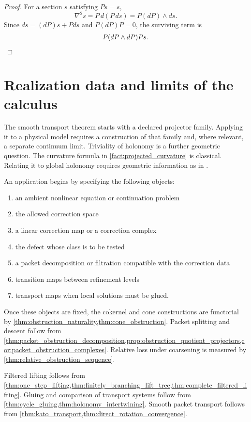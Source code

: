 \begin{proof}
For a section $s$ satisfying $Ps=s$,
\[
\nabla^2s=P\,d(P\,ds)=P(dP)\wedge ds.
\]
Since $ds=(dP)s+Pds$ and $P(dP)P=0$, the surviving term is
\[
P(dP\wedge dP)Ps.\qedhere
\]
\end{proof}

\section{Realization data and limits of the calculus}\label{sec:scope}

The smooth transport theorem starts with a declared projector family. Applying it to a physical model requires a construction of that family and, where relevant, a separate continuum limit. Triviality of holonomy is a further geometric question. The curvature formula in \cref{fact:projected_curvature} is classical. Relating it to global holonomy requires geometric information as in \cite{Kato1950,Kato1995,KobayashiNomizu1963}.

An application begins by specifying the following objects:
\begin{enumerate}
\item an ambient nonlinear equation or continuation problem
\item the allowed correction space
\item a linear correction map or a correction complex
\item the defect whose class is to be tested
\item a packet decomposition or filtration compatible with the correction data
\item transition maps between refinement levels
\item transport maps when local solutions must be glued.
\end{enumerate}

Once these objects are fixed, the cokernel and cone constructions are functorial by \cref{thm:obstruction_naturality,thm:cone_obstruction}. Packet splitting and descent follow from \cref{thm:packet_obstruction_decomposition,prop:obstruction_quotient_projectors,cor:packet_obstruction_complexes}. Relative loss under coarsening is measured by \cref{thm:relative_obstruction_sequence}.

Filtered lifting follows from \cref{thm:one_step_lifting,thm:finitely_branching_lift_tree,thm:complete_filtered_lifting}. Gluing and comparison of transport systems follow from \cref{thm:cycle_gluing,thm:holonomy_intertwining}. Smooth packet transport follows from \cref{thm:kato_transport,thm:direct_rotation_convergence}.

